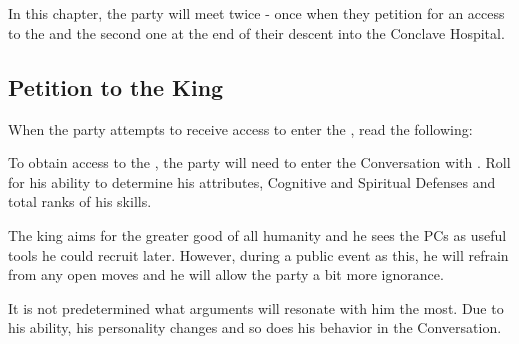 \section{\npcTaravangianName{}}
\label{sec:taravangian}

In this chapter, the party will meet \npcTaravangian{} twice - once when they petition for an access to the \locationPalanaeum{} and the second one at the end of their descent into the Conclave Hospital.






\subsection{Petition to the King}
\label{ssec:taravangianPetition}

When the party attempts to receive access to enter the \locationPalanaeum{}, read the following:


To obtain access to the \locationPalanaeum{}, the party will need to enter the Conversation with \enemyTaravangian{}. Roll for his \abilityTaravangianBoonName{} ability to determine his attributes, Cognitive and Spiritual Defenses and total ranks of his skills.

The king aims for the greater good of all humanity and he sees the PCs as useful tools he could recruit later. However, during a public event as this, he will refrain from any open moves and he will allow the party a bit more ignorance.

It is not predetermined what arguments will resonate with him the most. Due to his \abilityTaravangianBoonName{} ability, his personality changes and so does his behavior in the Conversation.


